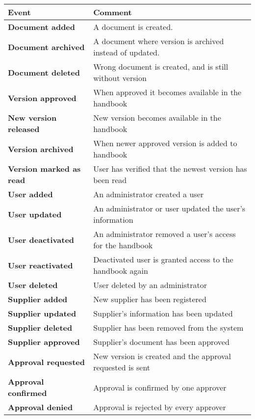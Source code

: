 \begin{table}[H]
	\begin{tabular}{m{} l}
		\hline
		Event & Comment\\
		\hline
		\textbf{Document added} & A document is created.\\
		\textbf{Document archived} & A document where version is archived instead of updated.\\
		\textbf{Document deleted} & Wrong document is created, and is still without version\\
		\textbf{Version approved}  & When approved it becomes available in the handbook\\
		\textbf{New version released} &  New version becomes available in the handbook\\
		\textbf{Version archived} & When newer approved version is added to handbook\\
		\textbf{Version marked \newline as read} & User has verified that the newest version has been read\\
		\textbf{User added} & An administrator created a user\\
		\textbf{User updated} & An administrator or user updated the user's information\\
		\textbf{User deactivated} & An administrator removed a user's access for the handbook\\
		\textbf{User reactivated} & Deactivated user is granted access to the handbook again\\
		\textbf{User deleted} & User deleted by an administrator\\
		\textbf{Supplier added} & New supplier has been registered\\
		\textbf{Supplier updated} & Supplier's information has been updated\\
		\textbf{Supplier deleted} & Supplier has been removed from the system\\
		\textbf{Supplier approved} & Supplier's document has been approved\\
		\textbf{Approval requested} & New version is created and the approval requested is sent\\
		\textbf{Approval confirmed}
		& Approval is confirmed by one approver\\
		\textbf{Approval denied}
		& Approval is rejected by every approver\\

\end{tabular}
\end{table}
